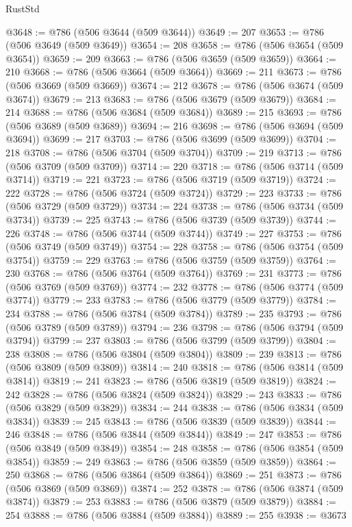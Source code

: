 \begin{lexlean}{RustStd}
\begin{coremodule}
@3648 := @786 (@506 @3644 (@509 @3644))
@3649 := 207
@3653 := @786 (@506 @3649 (@509 @3649))
@3654 := 208
@3658 := @786 (@506 @3654 (@509 @3654))
@3659 := 209
@3663 := @786 (@506 @3659 (@509 @3659))
@3664 := 210
@3668 := @786 (@506 @3664 (@509 @3664))
@3669 := 211
@3673 := @786 (@506 @3669 (@509 @3669))
@3674 := 212
@3678 := @786 (@506 @3674 (@509 @3674))
@3679 := 213
@3683 := @786 (@506 @3679 (@509 @3679))
@3684 := 214
@3688 := @786 (@506 @3684 (@509 @3684))
@3689 := 215
@3693 := @786 (@506 @3689 (@509 @3689))
@3694 := 216
@3698 := @786 (@506 @3694 (@509 @3694))
@3699 := 217
@3703 := @786 (@506 @3699 (@509 @3699))
@3704 := 218
@3708 := @786 (@506 @3704 (@509 @3704))
@3709 := 219
@3713 := @786 (@506 @3709 (@509 @3709))
@3714 := 220
@3718 := @786 (@506 @3714 (@509 @3714))
@3719 := 221
@3723 := @786 (@506 @3719 (@509 @3719))
@3724 := 222
@3728 := @786 (@506 @3724 (@509 @3724))
@3729 := 223
@3733 := @786 (@506 @3729 (@509 @3729))
@3734 := 224
@3738 := @786 (@506 @3734 (@509 @3734))
@3739 := 225
@3743 := @786 (@506 @3739 (@509 @3739))
@3744 := 226
@3748 := @786 (@506 @3744 (@509 @3744))
@3749 := 227
@3753 := @786 (@506 @3749 (@509 @3749))
@3754 := 228
@3758 := @786 (@506 @3754 (@509 @3754))
@3759 := 229
@3763 := @786 (@506 @3759 (@509 @3759))
@3764 := 230
@3768 := @786 (@506 @3764 (@509 @3764))
@3769 := 231
@3773 := @786 (@506 @3769 (@509 @3769))
@3774 := 232
@3778 := @786 (@506 @3774 (@509 @3774))
@3779 := 233
@3783 := @786 (@506 @3779 (@509 @3779))
@3784 := 234
@3788 := @786 (@506 @3784 (@509 @3784))
@3789 := 235
@3793 := @786 (@506 @3789 (@509 @3789))
@3794 := 236
@3798 := @786 (@506 @3794 (@509 @3794))
@3799 := 237
@3803 := @786 (@506 @3799 (@509 @3799))
@3804 := 238
@3808 := @786 (@506 @3804 (@509 @3804))
@3809 := 239
@3813 := @786 (@506 @3809 (@509 @3809))
@3814 := 240
@3818 := @786 (@506 @3814 (@509 @3814))
@3819 := 241
@3823 := @786 (@506 @3819 (@509 @3819))
@3824 := 242
@3828 := @786 (@506 @3824 (@509 @3824))
@3829 := 243
@3833 := @786 (@506 @3829 (@509 @3829))
@3834 := 244
@3838 := @786 (@506 @3834 (@509 @3834))
@3839 := 245
@3843 := @786 (@506 @3839 (@509 @3839))
@3844 := 246
@3848 := @786 (@506 @3844 (@509 @3844))
@3849 := 247
@3853 := @786 (@506 @3849 (@509 @3849))
@3854 := 248
@3858 := @786 (@506 @3854 (@509 @3854))
@3859 := 249
@3863 := @786 (@506 @3859 (@509 @3859))
@3864 := 250
@3868 := @786 (@506 @3864 (@509 @3864))
@3869 := 251
@3873 := @786 (@506 @3869 (@509 @3869))
@3874 := 252
@3878 := @786 (@506 @3874 (@509 @3874))
@3879 := 253
@3883 := @786 (@506 @3879 (@509 @3879))
@3884 := 254
@3888 := @786 (@506 @3884 (@509 @3884))
@3889 := 255
@3938 := @3673

\end{coremodule}
\end{lexlean}
